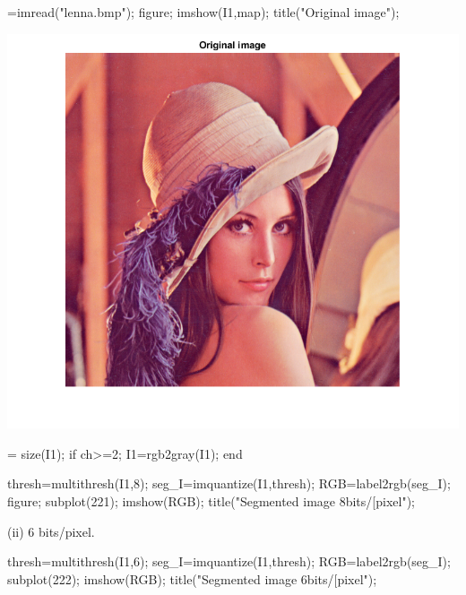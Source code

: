 \documentclass[12pt, onecolumn]{IEEEtran}
\begin{document}
\begin{matlabcode}
[I1 map]=imread("lenna.bmp");
figure; imshow(I1,map); title("Original image");
\end{matlabcode}
\begin{center}
\includegraphics[width=\maxwidth{69.44305067737079em}]{figure_5.png}
\end{center}
\begin{matlabcode}
[r c ch] = size(I1);
if ch>=2;
    I1=rgb2gray(I1);
end

thresh=multithresh(I1,8); %
seg_I=imquantize(I1,thresh); %
RGB=label2rgb(seg_I); %
figure; subplot(221); imshow(RGB); title("Segmented image 8bits/[pixel");
\end{matlabcode}

\begin{par}
\begin{flushleft}
(ii) 6 bits/pixel.
\end{flushleft}
\end{par}

\begin{matlabcode}
thresh=multithresh(I1,6); %
seg_I=imquantize(I1,thresh); %
RGB=label2rgb(seg_I); %
subplot(222); imshow(RGB); title("Segmented image 6bits/[pixel");
\end{matlabcode}
\end{document}
